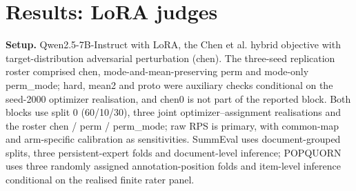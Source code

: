 \documentclass[10pt]{article}
\begin{document}
\section{Results: LoRA judges}


\textbf{Setup.} Qwen2.5-7B-Instruct with LoRA, the Chen et al. hybrid objective with target-distribution adversarial perturbation (chen). The three-seed replication roster comprised chen, mode-and-mean-preserving perm and mode-only perm\_mode; hard, mean2 and proto were auxiliary checks conditional on the seed-2000 optimizer realisation, and chen0 is not part of the reported block. Both blocks use split 0 (60/10/30), three joint optimizer--assignment realisations and the roster chen / perm / perm\_mode; raw RPS is primary, with common-map and arm-specific calibration as sensitivities. SummEval uses document-grouped splits, three persistent-expert folds and document-level inference; POPQUORN uses three randomly assigned annotation-position folds and item-level inference conditional on the realised finite rater panel.
\end{document}
